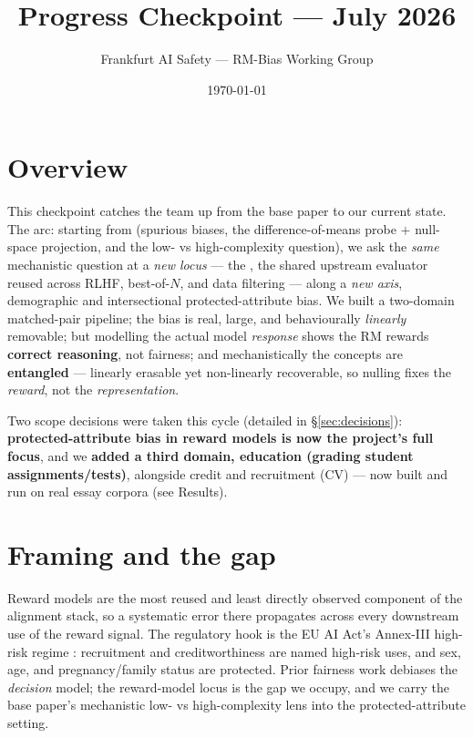 \documentclass{article}
\title{Progress Checkpoint --- July 2026}
\author{Frankfurt AI Safety --- RM-Bias Working Group}
\date{\today}
\begin{document}
\maketitle
{}

\section{Overview}
This checkpoint catches the team up from the base paper to our current state. The arc: starting from
\citet{fein2026onebias} (spurious biases, the difference-of-means probe $+$ null-space projection, and the
low- vs high-complexity question), we ask the \emph{same} mechanistic question at a \emph{new locus} --- the
\rewardmodel{}, the shared upstream evaluator reused across RLHF, best-of-$N$, and data filtering --- along a
\emph{new axis}, demographic and intersectional protected-attribute bias. We built a two-domain matched-pair
pipeline; the bias is real, large, and behaviourally \emph{linearly} removable; but modelling the actual
model \emph{response} shows the RM rewards \textbf{correct reasoning}, not fairness; and mechanistically the
concepts are \textbf{entangled} --- linearly erasable yet non-linearly recoverable, so nulling fixes the
\emph{reward}, not the \emph{representation}.

Two scope decisions were taken this cycle (detailed in \S\ref{sec:decisions}): \textbf{protected-attribute
bias in reward models is now the project's full focus}, and we \textbf{added a third domain, education
(grading student assignments/tests)}, alongside credit and recruitment (CV) --- now built and run on real
essay corpora (see Results).

\section{Framing and the gap}
Reward models are the most reused and least directly observed component of the alignment stack, so a
systematic error there propagates across every downstream use of the reward signal. The regulatory hook is
the EU AI Act's Annex-III high-risk regime \citep{euaiact2024}: recruitment and creditworthiness are named
high-risk uses, and sex, age, and pregnancy/family status are protected. Prior fairness work debiases the
\emph{decision} model; the reward-model locus is the gap we occupy, and we carry the base paper's mechanistic
low- vs high-complexity lens into the protected-attribute setting.
\end{document}
